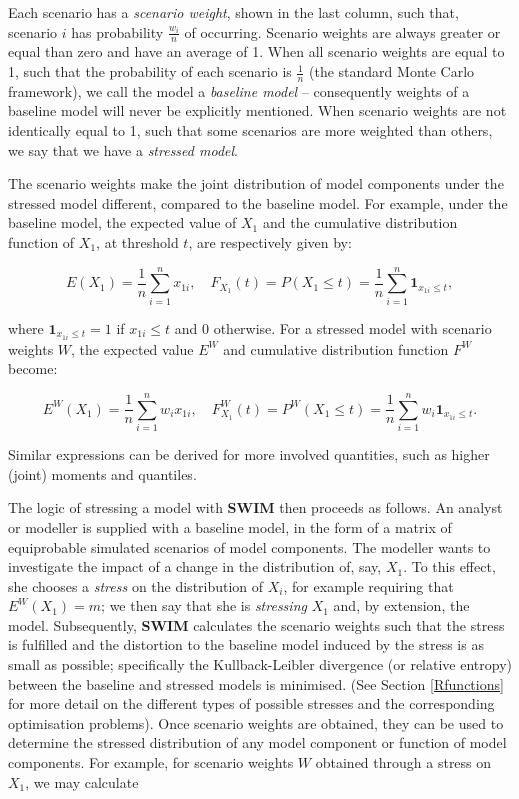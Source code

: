 \documentclass[
]{article}
\begin{document}
Each scenario has a \emph{scenario weight}, shown in the last column, such that, scenario \(i\) has probability \(\frac{w_i}{n}\) of occurring. Scenario weights are always greater or equal than zero and have an average of 1. When all scenario weights are equal to 1, such that the probability of each scenario is \(\frac 1 n\) (the standard Monte Carlo framework), we call the model a \emph{baseline model} -- consequently weights of a baseline model will never be explicitly mentioned. When scenario weights are not identically equal to 1, such that some scenarios are more weighted than others, we say that we have a \emph{stressed model}.

The scenario weights make the joint distribution of model components under the stressed model different, compared to the baseline model. For example, under the baseline model, the expected value of \(X_1\) and the cumulative distribution function of \(X_1\), at threshold \(t\), are respectively given by:

\[
E(X_1)=\frac 1  n \sum_{i=1}^nx_{1i},\quad F_{X_1}(t)= P(X_1\leq t)=\frac 1 n \sum_{i=1}^n \mathbf 1 _{x_{1i}\leq t},
\]

where \(\mathbf 1 _{x_{1i}\leq t}=1\) if \(x_{1i}\leq t\) and \(0\) otherwise. For a stressed model with scenario weights \(W\), the expected value \(E^W\) and cumulative distribution function \(F^W\) become:

\[
E^W(X_1)=\frac 1  n \sum_{i=1}^n w_i x_{1i},\quad F_{X_1}^W(t)=P^W(X_1\leq t)=\frac 1 n \sum_{i=1}^n w_i \mathbf 1 _{x_{1i}\leq t}.
\]

Similar expressions can be derived for more involved quantities, such as higher (joint) moments and quantiles.

The logic of stressing a model with \textbf{SWIM} then proceeds as follows. An analyst or modeller is supplied with a baseline model, in the form of a matrix of equiprobable simulated scenarios of model components. The modeller wants to investigate the impact of a change in the distribution of, say, \(X_1\). To this effect, she chooses a \emph{stress} on the distribution of \(X_i\), for example requiring that \(E^W(X_1)=m\); we then say that she is \emph{stressing} \(X_1\) and, by extension, the model. Subsequently, \textbf{SWIM} calculates the scenario weights such that the stress is fulfilled and the distortion to the baseline model induced by the stress is as small as possible; specifically the Kullback-Leibler divergence (or relative entropy) between the baseline and stressed models is minimised. (See Section \ref{Rfunctions} for more detail on the different types of possible stresses and the corresponding optimisation problems). Once scenario weights are obtained, they can be used to determine the stressed distribution of any model component or function of model components. For example, for scenario weights \(W\) obtained through a stress on \(X_1\), we may calculate
\end{document}
